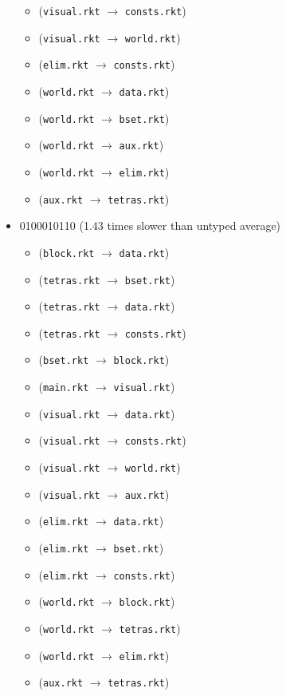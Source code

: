 \documentclass{article}
\newcommand{\mono}[1]{\texttt{#1}}
\begin{document}
\begin{itemize}
\begin{itemize}
  \item (\mono{visual.rkt} $\rightarrow$ \mono{consts.rkt})
  \item (\mono{visual.rkt} $\rightarrow$ \mono{world.rkt})
  \item (\mono{elim.rkt} $\rightarrow$ \mono{consts.rkt})
  \item (\mono{world.rkt} $\rightarrow$ \mono{data.rkt})
  \item (\mono{world.rkt} $\rightarrow$ \mono{bset.rkt})
  \item (\mono{world.rkt} $\rightarrow$ \mono{aux.rkt})
  \item (\mono{world.rkt} $\rightarrow$ \mono{elim.rkt})
  \item (\mono{aux.rkt} $\rightarrow$ \mono{tetras.rkt})
  \end{itemize}
\item 0100010110 (1.43 times slower than untyped average)
  \begin{itemize}
  \item (\mono{block.rkt} $\rightarrow$ \mono{data.rkt})
  \item (\mono{tetras.rkt} $\rightarrow$ \mono{bset.rkt})
  \item (\mono{tetras.rkt} $\rightarrow$ \mono{data.rkt})
  \item (\mono{tetras.rkt} $\rightarrow$ \mono{consts.rkt})
  \item (\mono{bset.rkt} $\rightarrow$ \mono{block.rkt})
  \item (\mono{main.rkt} $\rightarrow$ \mono{visual.rkt})
  \item (\mono{visual.rkt} $\rightarrow$ \mono{data.rkt})
  \item (\mono{visual.rkt} $\rightarrow$ \mono{consts.rkt})
  \item (\mono{visual.rkt} $\rightarrow$ \mono{world.rkt})
  \item (\mono{visual.rkt} $\rightarrow$ \mono{aux.rkt})
  \item (\mono{elim.rkt} $\rightarrow$ \mono{data.rkt})
  \item (\mono{elim.rkt} $\rightarrow$ \mono{bset.rkt})
  \item (\mono{elim.rkt} $\rightarrow$ \mono{consts.rkt})
  \item (\mono{world.rkt} $\rightarrow$ \mono{block.rkt})
  \item (\mono{world.rkt} $\rightarrow$ \mono{tetras.rkt})
  \item (\mono{world.rkt} $\rightarrow$ \mono{elim.rkt})
  \item (\mono{aux.rkt} $\rightarrow$ \mono{tetras.rkt})

\end{itemize}
\end{itemize}
\end{document}

